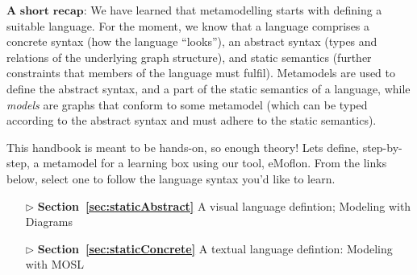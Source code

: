 $\textbf{A short recap:}$  
We have learned that metamodelling starts with defining a suitable language.
For the moment, we know that a language comprises a concrete syntax (how the language ``looks''),  an abstract syntax (types and relations of the underlying graph structure), and static semantics (further constraints that members of the language must fulfil).
Metamodels are used to define the abstract syntax, and a part of the static semantics of a language, while \emph{models} are graphs that conform to some
metamodel (which can be typed according to the abstract syntax and must adhere to the static semantics).

This handbook is meant to be hands-on, so enough theory!
Lets define, step-by-step, a metamodel for a learning box using our tool, eMoflon. From the links below, select one to follow the language syntax you'd like to learn.

\vspace{1cm}

\begin{itemize}
  \item[$\triangleright$] {\bf Section~\ref{sec:staticAbstract}} A visual language defintion; Modeling with Diagrams
  \item[$\triangleright$] {\bf Section~\ref{sec:staticConcrete}} A textual language defintion: Modeling with MOSL
\end{itemize}